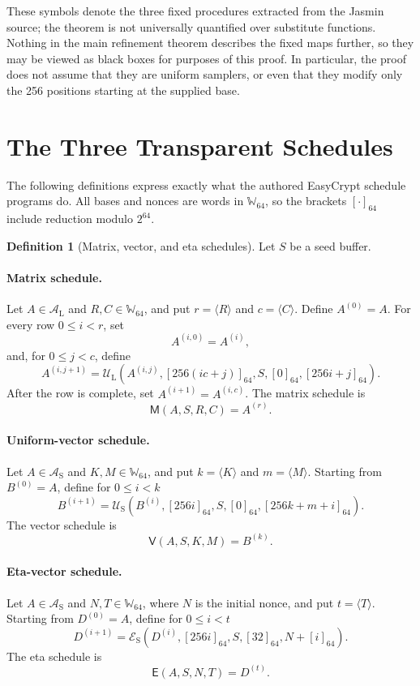 \documentclass[11pt]{article}
\theoremstyle{definition}
\newtheorem{definition}{Definition}
\theoremstyle{plain}
\theoremstyle{remark}
\newcommand{\W}{\mathbb W_{64}}
\newcommand{\enc}[1]{\left[#1\right]_{64}}
\newcommand{\uint}[1]{\langle #1\rangle}
\newcommand{\AL}{\mathcal A_{\mathrm L}}
\newcommand{\AS}{\mathcal A_{\mathrm S}}
\newcommand{\UL}{\mathcal U_{\mathrm L}}
\newcommand{\US}{\mathcal U_{\mathrm S}}
\newcommand{\ES}{\mathcal E_{\mathrm S}}
\newcommand{\SchedMat}{\mathsf M}
\newcommand{\SchedVec}{\mathsf V}
\newcommand{\SchedEta}{\mathsf E}
\begin{document}
These symbols denote the three fixed procedures extracted from the Jasmin
source; the theorem is not universally quantified over substitute functions.
Nothing in the main refinement theorem describes the fixed maps further, so
they may be viewed as black boxes for purposes of this proof.  In particular,
the proof does not assume that they are uniform samplers, or even that they
modify only the 256 positions starting at the supplied base.

\section{The Three Transparent Schedules}
\label{sec:schedules}

The following definitions express exactly what the authored EasyCrypt schedule
programs do.  All bases and nonces are words in $\W$, so the brackets
$\enc{\cdot}$ include reduction modulo $2^{64}$.

\begin{definition}[Matrix, vector, and eta schedules]
\label{def:schedules}
Let $S$ be a seed buffer.

\paragraph{Matrix schedule.}
Let $A\in\AL$ and $R,C\in\W$, and put $r=\uint{R}$ and $c=\uint{C}$.
Define $A^{(0)}=A$.  For every row $0\le i<r$, set
\[
  A^{(i,0)}=A^{(i)},
\]
and, for $0\le j<c$, define
\[
  A^{(i,j+1)}=
  \UL\!\left(
    A^{(i,j)},
    \enc{256(ic+j)},
    S,
    \enc{0},
    \enc{256i+j}
  \right).
\]
After the row is complete, set $A^{(i+1)}=A^{(i,c)}$.  The matrix schedule is
\[
  \SchedMat(A,S,R,C)=A^{(r)}.
\]

\paragraph{Uniform-vector schedule.}
Let $A\in\AS$ and $K,M\in\W$, and put $k=\uint{K}$ and $m=\uint{M}$.
Starting from $B^{(0)}=A$, define for $0\le i<k$
\[
  B^{(i+1)}=
  \US\!\left(
    B^{(i)},
    \enc{256i},
    S,
    \enc{0},
    \enc{256k+m+i}
  \right).
\]
The vector schedule is
\[
  \SchedVec(A,S,K,M)=B^{(k)}.
\]

\paragraph{Eta-vector schedule.}
Let $A\in\AS$ and $N,T\in\W$, where $N$ is the initial nonce, and put
$t=\uint{T}$.  Starting from $D^{(0)}=A$, define for $0\le i<t$
\[
  D^{(i+1)}=
  \ES\!\left(
    D^{(i)},
    \enc{256i},
    S,
    \enc{32},
    N+\enc{i}
  \right).
\]
The eta schedule is
\[
  \SchedEta(A,S,N,T)=D^{(t)}.
\]
\end{definition}
\end{document}
